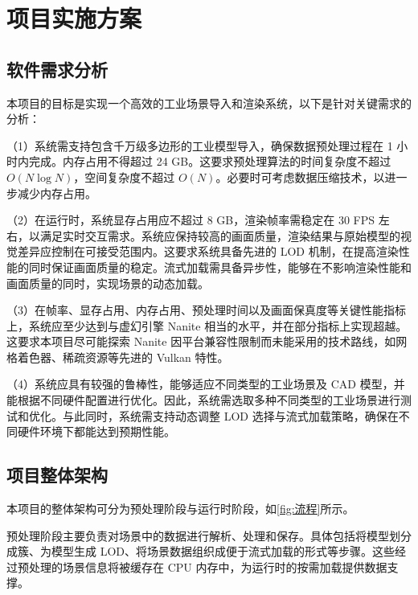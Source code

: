 \cleardoublepage

\section{项目实施方案}

\subsection{软件需求分析}

本项目的目标是实现一个高效的工业场景导入和渲染系统，以下是针对关键需求的分析：

\par （1）系统需支持包含千万级多边形的工业模型导入，确保数据预处理过程在 1 小时内完成。内存占用不得超过 24 GB。这要求预处理算法的时间复杂度不超过 $O(N\log N)$，空间复杂度不超过 $O(N)$。必要时可考虑数据压缩技术，以进一步减少内存占用。

\par （2）在运行时，系统显存占用应不超过 8 GB，渲染帧率需稳定在 30 FPS 左右，以满足实时交互需求。系统应保持较高的画面质量，渲染结果与原始模型的视觉差异应控制在可接受范围内。这要求系统具备先进的 LOD 机制，在提高渲染性能的同时保证画面质量的稳定。流式加载需具备异步性，能够在不影响渲染性能和画面质量的同时，实现场景的动态加载。

\par （3）在帧率、显存占用、内存占用、预处理时间以及画面保真度等关键性能指标上，系统应至少达到与虚幻引擎 Nanite 相当的水平，并在部分指标上实现超越。这要求本项目尽可能探索 Nanite 因平台兼容性限制而未能采用的技术路线，如网格着色器、稀疏资源等先进的 Vulkan 特性。

\par （4）系统应具有较强的鲁棒性，能够适应不同类型的工业场景及 CAD 模型，并能根据不同硬件配置进行优化。因此，系统需选取多种不同类型的工业场景进行测试和优化。与此同时，系统需支持动态调整 LOD 选择与流式加载策略，确保在不同硬件环境下都能达到预期性能。

\subsection{项目整体架构}

\par 本项目的整体架构可分为预处理阶段与运行时阶段，如\autoref{fig:流程}所示。

预处理阶段主要负责对场景中的数据进行解析、处理和保存。具体包括将模型划分成簇、为模型生成 LOD、将场景数据组织成便于流式加载的形式等步骤。这些经过预处理的场景信息将被缓存在 CPU 内存中，为运行时的按需加载提供数据支撑。

